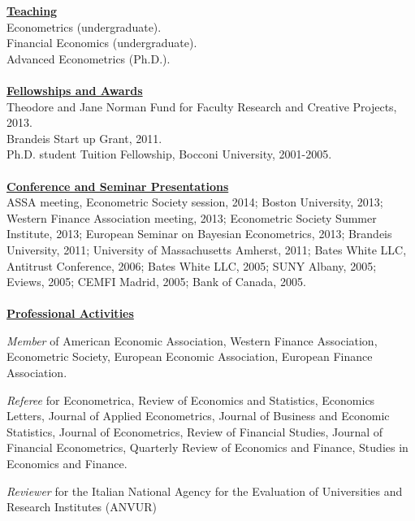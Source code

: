 \documentclass[12pt]{article}
\begin{document}
\begin{itemize}
	\end{itemize}


\underline{\textbf{Teaching}}\\
Econometrics (undergraduate).\\
Financial Economics (undergraduate). \\
Advanced Econometrics (Ph.D.). \\ \\
\underline{\textbf{Fellowships and Awards}}\\
Theodore and Jane Norman Fund for Faculty Research and Creative Projects, 2013. \\
Brandeis Start up Grant, 2011. \\
Ph.D. student Tuition Fellowship, Bocconi University, 2001-2005.\\ \\
\underline{\textbf{Conference and Seminar Presentations}}\\
ASSA meeting, Econometric Society session, 2014; Boston University, 2013; Western Finance Association meeting, 2013; Econometric Society Summer Institute, 2013; European Seminar on Bayesian Econometrics, 2013; Brandeis University, 2011; University of Massachusetts Amherst, 2011; Bates White LLC, Antitrust Conference, 2006; Bates White LLC, 2005; SUNY Albany, 2005; Eviews, 2005; CEMFI Madrid, 2005; Bank of Canada, 2005.\\ \\
\underline{\textbf{Professional Activities}}
\begin{description}
	\item\emph{Member} of American Economic Association, Western Finance Association, Econometric Society, European Economic Association, European Finance Association.

\item \emph{Referee} for Econometrica, Review of Economics and Statistics, Economics Letters, Journal of Applied Econometrics, Journal of Business and Economic Statistics, Journal of Econometrics, Review of Financial Studies, Journal of Financial Econometrics, Quarterly Review of Economics and Finance, Studies in Economics and Finance.

\item \emph{Reviewer} for the Italian National Agency for the Evaluation of Universities and Research Institutes (ANVUR) 
\end{description}
 
\end{document}
